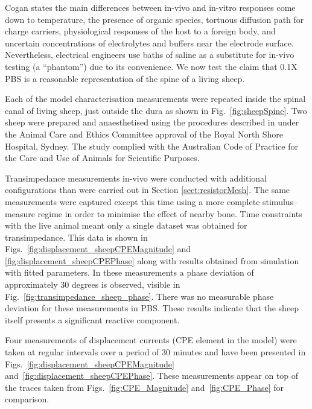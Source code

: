 \documentclass[journal, a4paper]{IEEEtran}
\begin{document}
Cogan states the main differences between in-vivo and in-vitro responses come down to temperature, the presence of organic species, tortuous diffusion path for charge carriers, physiological responses of the host to a foreign body, and uncertain concentrations of electrolytes and buffers near the electrode surface.\cite{Cogan2008}
Nevertheless, electrical engineers use baths of saline as a substitute for in-vivo testing (a ``phantom'') due to its convenience.
We now test the claim that 0.1X PBS is a reasonable representation of the spine of a living sheep.

{\color{blue} Each of the model characterisation} measurements were repeated inside the spinal canal of living sheep, just outside the dura as shown in Fig.~\ref{fig:sheepSpine}. Two sheep were prepared and anaesthetised using the procedures described in \cite{Parker2013} under the Animal Care and Ethics Committee approval of the Royal North Shore Hospital, Sydney. The study complied with the Australian Code of Practice for the Care and Use of Animals for Scientific Purposes.

{
    \color{blue}
    Transimpedance measurements in-vivo were {\color{blue} conducted with} additional configurations than were carried out in Section \ref{sect:resistorMesh}. The same measurements were captured {\color{blue} except this time using} a more complete stimulus--measure regime in order to minimise the effect of nearby bone. Time constraints with the live animal meant only {\color{blue} a single} dataset was obtained for transimpedance. {\color{blue} This data is} shown in Figs.~\ref{fig:displacement_sheepCPEMagnitude} and \ref{fig:displacement_sheepCPEPhase} along with results obtained {\color{blue} from} simulation {\color{blue} with} fitted parameters.
}
{\color{blue} In these measurements a phase deviation of approximately 30 degrees is observed, visible in Fig.~\ref{fig:transimpedance_sheep_phase}. There was no measurable phase deviation for these measurements in PBS. These results indicate that the sheep itself presents a significant reactive component.}

{\color{blue}
    Four measurements of displacement currents (CPE element in the model) were} taken at regular intervals over a period of 30 minutes and have been presented in Figs.~\ref{fig:displacement_sheepCPEMagnitude} and~\ref{fig:displacement_sheepCPEPhase}.
{\color{blue} These measurements appear on top of the traces taken from Figs.~\ref{fig:CPE_Magnitude} and~\ref{fig:CPE_Phase} for comparison.}
\end{document}
